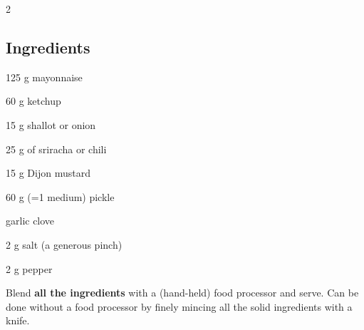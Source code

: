 \newpage
{}

\begin{multicols}{2}
	\subsection*{Ingredients}
	\begin{ingredients}
		\item 125 g mayonnaise
		\item 60 g ketchup
		\item 15 g shallot or onion
		\item 25 g of sriracha or chili
		\item 15 g Dijon mustard
		\item 60 g (=1 medium) pickle
		\item {} garlic clove
		\item 2 g salt (a generous pinch)
		\item 2 g pepper
	\end{ingredients}
\end{multicols}

\medskip

Blend \textbf{all the ingredients} with a (hand-held) food processor and serve. 
Can be done without a food processor by finely mincing all the solid ingredients with a knife. 


\vspace*{0.75 cm}

\begin{recipeblock}
	
\end{recipeblock}